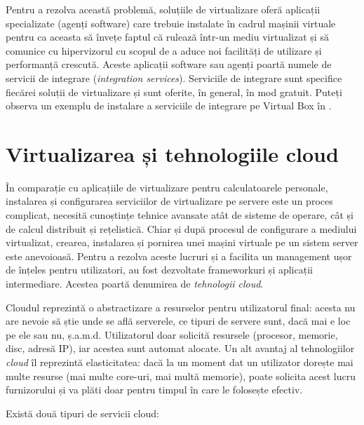 Pentru a rezolva această
problemă, soluțiile de virtualizare oferă aplicații specializate (agenți
software) care trebuie instalate în cadrul mașinii virtuale pentru ca aceasta să
învețe faptul că rulează într-un mediu virtualizat și să comunice cu
hipervizorul cu scopul de a aduce noi facilități de utilizare și performanță
crescută. Aceste aplicații software sau agenți poartă numele de servicii de
integrare (\textit{integration services}). Serviciile de integrare sunt
specifice fiecărei soluții de virtualizare și sunt oferite, în general, în mod
gratuit. Puteți observa un exemplu de instalare a serviciile de integrare pe
Virtual Box în .

\section{Virtualizarea și tehnologiile cloud}
\label{sec:vm:cloud}

În comparație cu aplicațiile de virtualizare pentru calculatoarele personale,
instalarea și configurarea serviciilor de virtualizare pe servere este un proces
complicat, necesită cunoștințe tehnice avansate atât de sisteme de operare, cât
și de calcul distribuit și rețelistică. Chiar și după procesul de
configurare a mediului virtualizat, crearea,
instalarea și pornirea unei mașini virtuale pe un sistem server este anevoioasă.
Pentru a rezolva aceste lucruri și a facilita un management ușor de înțeles
pentru utilizatori, au fost dezvoltate frameworkuri și aplicații intermediare. Acestea poartă
denumirea de \textit{tehnologii cloud}.

Cloudul reprezintă o abstractizare a resurselor
pentru utilizatorul final: acesta nu are nevoie să știe unde se află
serverele, ce tipuri de servere sunt, dacă mai e loc pe ele sau nu, ș.a.m.d.
Utilizatorul doar solicită resursele (procesor, memorie, disc, adresă IP), iar
acestea sunt automat alocate. Un alt avantaj al tehnologiilor \textit{cloud} îl
reprezintă elasticitatea: dacă la un moment dat un utilizator dorește mai multe
resurse (mai multe core-uri, mai multă memorie), poate solicita acest lucru
furnizorului și va plăti doar pentru timpul în care le folosește efectiv.

Există două tipuri de servicii cloud:

